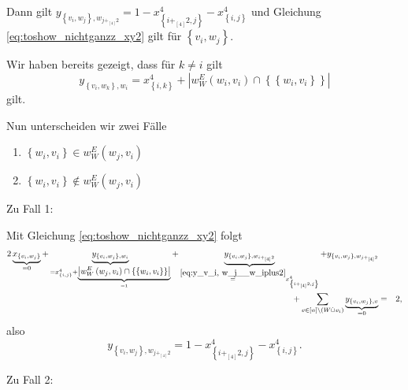 \documentclass[10p,a4paper,BCOR = 12mm, DIV=15]{scrbook}
\begin{document}
\begin{bew}
Dann gilt $y_{\left\{v_i, w_j\right\}, w_{j +_{\left[4\right]} 2}} = 1 - x^{4}_{\left\{i+_{\left[4\right]} 2, j\right\}} - x^{4}_{\left\{i, j\right\}}$ und Gleichung \eqref{eq:toshow_nichtganzz_xy2} gilt für $\left\{v_i, w_j\right\}$.

Wir haben bereits gezeigt, dass für $k \neq i$ gilt
\begin{displaymath}
y_{\left\{v_i, w_k\right\}, w_i} = x^{4}_{\left\{i, k\right\}} + \left|w_W^E\left(w_i, v_i\right) \cap \left\{\left\{w_i, v_i\right\}\right\}\right|
\end{displaymath}
gilt.

Nun unterscheiden wir zwei Fälle
\begin{enumerate}
\item $\left\{w_i, v_i\right\} \in w_W^E\left(w_j, v_i\right)$
\item $\left\{w_i, v_i\right\} \notin w_W^E\left(w_j, v_i\right)$
\end{enumerate}

Zu Fall 1:

Mit Gleichung \eqref{eq:toshow_nichtganzz_xy2} folgt
\begin{eqnarray*}
2 \underbrace{x_{\left\{v_i, w_j\right\}}}_{= 0} + \underbrace{y_{\left\{v_i, w_j\right\}, w_i}}_{= x^{4}_{\left\{i, j\right\}} + \underbrace{\left|w_W^E\left(w_j, v_i\right) \cap \left\{\left\{w_i, v_i\right\}\right\}\right|}_{=1}} + \underbrace{y_{\left\{v_i, w_j\right\}, w_{i +_{\left[4\right]} 2}}}_{\stackrel{\eqref{eq:y_v_i, w_j__w_iplus2}}{=} x^{4}_{\left\{i+_{\left[4\right]} 2, j\right\}}} + y_{\left\{v_i, w_j\right\}, w_{j +_{\left[4\right]} 2}} & & \\
+ \sum_{v \in \left[n\right] \backslash \left(W \mathbin{\dot{\cup}} v_i\right)} \underbrace{y_{\left\{v_i, w_j\right\}, v}}_{= 0} & = & 2,
\end{eqnarray*}
also
\begin{displaymath}
y_{\left\{v_i, w_j\right\}, w_{j +_{\left[4\right]} 2}} = 1 - x^{4}_{\left\{i+_{\left[4\right]} 2, j\right\}} - x^{4}_{\left\{i, j\right\}}.
\end{displaymath}

Zu Fall 2:


\end{bew}
\end{document}

